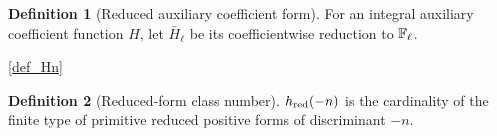 \documentclass[11pt,a4paper]{article}
\numberwithin{equation}{section}
\theoremstyle{plain}\newtheorem{theorem}{Theorem}[section]\newaliascnt{proposition}{theorem}\newtheorem{proposition}[proposition]{Proposition}\aliascntresetthe{proposition}\newaliascnt{lemma}{theorem}\newtheorem{lemma}[lemma]{Lemma}\aliascntresetthe{lemma}
\theoremstyle{definition}\newaliascnt{definition}{theorem}\newtheorem{definition}[definition]{Definition}\aliascntresetthe{definition}\newaliascnt{notation}{theorem}\newtheorem{notation}[notation]{Notation}\aliascntresetthe{notation}
\providecommand{\lean}[1]{}\providecommand{\leanok}{}
\begin{document}
\begin{definition}[Reduced auxiliary coefficient form]\label{def_reduced_auxiliary_form}\lean{SptCM.Repair.reducedAuxiliaryForm}\leanok
For an integral auxiliary coefficient function $H$, let $\bar H_\ell$ be its coefficientwise reduction to $\mathbb F_\ell$.
\end{definition}
\begin{uses-statement}\ref{def_Hn}\end{uses-statement}
\begin{definition}[Reduced-form class number]\label{def_negative_class_number}\lean{SptCM.negativeClassNumber}\leanok
$h_{\rm red}(-n)$ is the cardinality of the finite type of primitive reduced positive forms of discriminant $-n$.
\end{definition}
\end{document}

